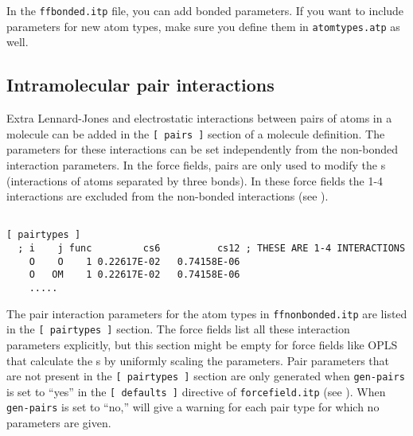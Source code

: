 In the {\tt ffbonded.itp} file, you can add bonded parameters. If you
want to include parameters for new atom types, make sure you define
them in {\tt atomtypes.atp} as well.



\subsection{Intramolecular pair interactions}
\label{subsec:pairinteractions}
Extra Lennard-Jones and electrostatic interactions between pairs
of atoms in a molecule can be added in the {\tt [~pairs~]} section of
a molecule definition. The parameters for these interactions can
be set independently from the non-bonded interaction parameters.
In the {\gromos} force fields, pairs are only used
to modify the s (interactions of atoms
separated by three bonds). In these force fields the 1-4 interactions
are excluded from the non-bonded interactions (see ).

{\small
\begin{verbatim}

[ pairtypes ]
  ; i    j func         cs6          cs12 ; THESE ARE 1-4 INTERACTIONS
    O    O    1 0.22617E-02   0.74158E-06
    O   OM    1 0.22617E-02   0.74158E-06
    .....
\end{verbatim}}

The pair interaction parameters for the atom types
in {\tt ffnonbonded.itp} are listed in the {\tt [~pairtypes~]} section.
The {\gromos} force fields list all these interaction parameters
explicitly, but this section might be empty for force fields like
OPLS that calculate the s by uniformly scaling the parameters.
Pair parameters that are not present in the {\tt [~pairtypes~]} section
are only generated when {\tt gen-pairs} is set to ``yes'' in the {\tt [~defaults~]}
directive of {\tt forcefield.itp} (see ). 
When {\tt gen-pairs} is set to ``no,'' {\tt {}}
will give a warning for each pair type for which no parameters are given.

